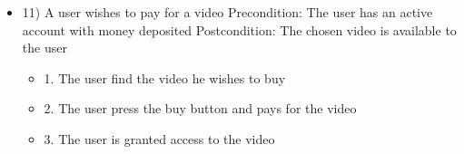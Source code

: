 \begin{itemize}
\item 11)
A user wishes to pay for a video
\newline Precondition: The user has an active account with money deposited
\newline Postcondition: The chosen video is available to the user
\begin{itemize}
	\item 1. The user find the video he wishes to buy
	\item 2. The user press the buy button and pays for the video
	\item 3. The user is granted access to the video
\end{itemize}
\end{itemize}